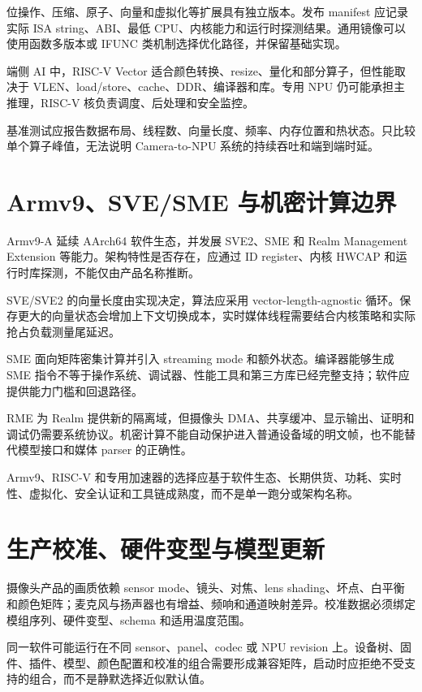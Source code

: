 位操作、压缩、原子、向量和虚拟化等扩展具有独立版本。发布 manifest 应记录实际 ISA string、ABI、最低 CPU、内核能力和运行时探测结果。通用镜像可以使用函数多版本或 IFUNC 类机制选择优化路径，并保留基础实现。

端侧 AI 中，RISC-V Vector 适合颜色转换、resize、量化和部分算子，但性能取决于 VLEN、load/store、cache、DDR、编译器和库。专用 NPU 仍可能承担主推理，RISC-V 核负责调度、后处理和安全监控。

基准测试应报告数据布局、线程数、向量长度、频率、内存位置和热状态。只比较单个算子峰值，无法说明 Camera-to-NPU 系统的持续吞吐和端到端时延。

\section{Armv9、SVE/SME 与机密计算边界}

Armv9-A 延续 AArch64 软件生态，并发展 SVE2、SME 和 Realm Management Extension 等能力\cite{armv9-guide}。架构特性是否存在，应通过 ID register、内核 HWCAP 和运行时库探测，不能仅由产品名称推断。

SVE/SVE2 的向量长度由实现决定，算法应采用 vector-length-agnostic 循环。保存更大的向量状态会增加上下文切换成本，实时媒体线程需要结合内核策略和实际抢占负载测量尾延迟。

SME 面向矩阵密集计算并引入 streaming mode 和额外状态。编译器能够生成 SME 指令不等于操作系统、调试器、性能工具和第三方库已经完整支持；软件应提供能力门槛和回退路径。

RME 为 Realm 提供新的隔离域，但摄像头 DMA、共享缓冲、显示输出、证明和调试仍需要系统协议。机密计算不能自动保护进入普通设备域的明文帧，也不能替代模型接口和媒体 parser 的正确性。

Armv9、RISC-V 和专用加速器的选择应基于软件生态、长期供货、功耗、实时性、虚拟化、安全认证和工具链成熟度，而不是单一跑分或架构名称。

\section{生产校准、硬件变型与模型更新}

摄像头产品的画质依赖 sensor mode、镜头、对焦、lens shading、坏点、白平衡和颜色矩阵；麦克风与扬声器也有增益、频响和通道映射差异。校准数据必须绑定模组序列、硬件变型、schema 和适用温度范围。

同一软件可能运行在不同 sensor、panel、codec 或 NPU revision 上。设备树、固件、插件、模型、颜色配置和校准的组合需要形成兼容矩阵，启动时应拒绝不受支持的组合，而不是静默选择近似默认值。

